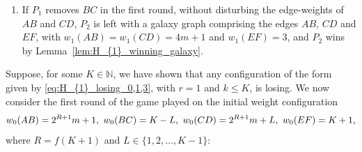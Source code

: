 \documentclass[11pt,reqno]{amsart}
\theoremstyle{definition}
\theoremstyle{definition}
\begin{document}
\begin{enumerate}
\item If $P_{1}$ removes $BC$ in the first round, without disturbing the edge-weights of $AB$ and $CD$, $P_{2}$ is left with a galaxy graph comprising the edges $AB$, $CD$ and $EF$, with $w_{1}(AB)=w_{1}(CD)=4m+1$ and $w_{1}(EF)=3$, and $P_{2}$ wins by Lemma~\ref{lem:H_{1}_winning_galaxy}. 
\end{enumerate}

Suppose, for some $K \in \mathbb{N}$, we have shown that any configuration of the form given by \eqref{eq:H_{1}_losing_0,1,3}, with $r=1$ and $k \leqslant K$, is losing. We now consider the first round of the game played on the initial weight configuration
\begin{align}
w_{0}(AB)=2^{R+1}m+1,\ w_{0}(BC)=K-L,\ w_{0}(CD)=2^{R+1}m+L,\ w_{0}(EF)=K+1,\label{eq:H_{1}_losing_1_inductive}
\end{align}
where $R=f(K+1)$ and $L \in \{1,2,\ldots,K-1\}$:
\end{document}
